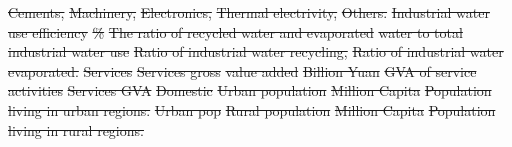 \documentclass[default, sn-standardnature]{sn-jnl} %
\providecommand{\DIFdeltex}[1]{{\protect\color{red}\sout{#1}}}                      %
\providecommand{\DIFdelFL}[1]{\DIFdel{#1}} %
\providecommand{\DIFdel}[1]{\texorpdfstring{\DIFdeltex{#1}}{}} %
\begin{document}
\begin{table}[!ht]
\DIFdelFL{Cements, }%
\DIFdelFL{Machinery, }%
\DIFdelFL{Electronics, }%
\DIFdelFL{Thermal electrivity, }%
\DIFdelFL{Others.}%
\DIFdelFL{Industrial water }%
\DIFdelFL{use efficiency}%
\DIFdelFL{\% }%
\DIFdelFL{The ratio of recycled water and evaporated }%
\DIFdelFL{water to total industrial water use}%
\DIFdelFL{Ratio of industrial water recycling, }%
\DIFdelFL{Ratio of industrial water evaporated.}%
\DIFdelFL{Services }%
\DIFdelFL{Services gross }%
\DIFdelFL{value added}%
\DIFdelFL{Billion Yuan }%
\DIFdelFL{GVA of service activities }%
\DIFdelFL{Services GVA }%
\DIFdelFL{Domestic }%
\DIFdelFL{Urban population }%
\DIFdelFL{Million Capita }%
\DIFdelFL{Population living in urban regions. }%
\DIFdelFL{Urban pop }%
\DIFdelFL{Rural population }%
\DIFdelFL{Million Capita }%
\DIFdelFL{Population living in rural regions. }%

\end{table}
\end{document}
